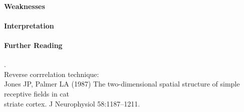 \documentclass[11pt]{article}
\begin{document}
\paragraph{Weaknesses}

\paragraph{Interpretation}

\paragraph{Further Reading} \tiny{.}\\
Reverse corrrelation technique: \\
\hspace*{0.5in} Jones JP, Palmer LA (1987) The two-dimensional spatial structure of simple receptive fields in cat \\
\hspace*{0.5in} striate cortex. J Neurophysiol 58:1187–1211. \\
\end{document}

